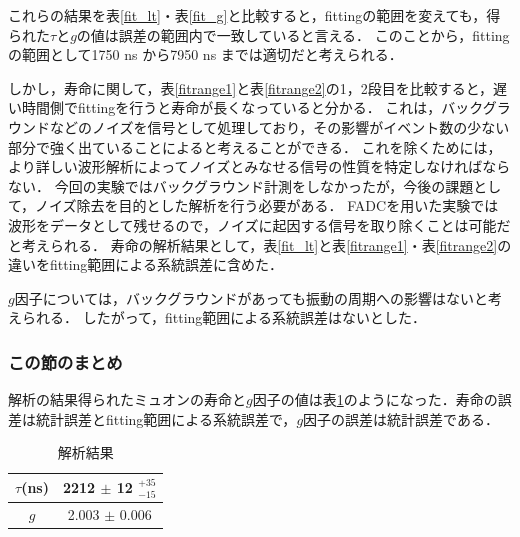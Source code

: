 これらの結果を表\ref{fit_lt}・表\ref{fit_g}と比較すると，fittingの範囲を変えても，得られた$\tau$と$g$の値は誤差の範囲内で一致していると言える．
このことから，fittingの範囲として1750 ns から7950 ns までは適切だと考えられる．

しかし，寿命に関して，表\ref{fitrange1}と表\ref{fitrange2}の1，2段目を比較すると，遅い時間側でfittingを行うと寿命が長くなっていると分かる．
これは，バックグラウンドなどのノイズを信号として処理しており，その影響がイベント数の少ない部分で強く出ていることによると考えることができる．
これを除くためには，より詳しい波形解析によってノイズとみなせる信号の性質を特定しなければならない．
今回の実験ではバックグラウンド計測をしなかったが，今後の課題として，ノイズ除去を目的とした解析を行う必要がある．
FADCを用いた実験では波形をデータとして残せるので，ノイズに起因する信号を取り除くことは可能だと考えられる．
寿命の解析結果として，表\ref{fit_lt}と表\ref{fitrange1}・表\ref{fitrange2}の違いをfitting範囲による系統誤差に含めた．

$g$因子については，バックグラウンドがあっても振動の周期への影響はないと考えられる．
したがって，fitting範囲による系統誤差はないとした．

\subsubsection{この節のまとめ}
解析の結果得られたミュオンの寿命と$g$因子の値は表\ref{matome_ike}のようになった．寿命の誤差は統計誤差とfitting範囲による系統誤差で，$g$因子の誤差は統計誤差である．

\begin{table}[H]
\caption{解析結果}
\label{matome_ike}
\begin{center}
\begin{tabular}{cc}\toprule
$\tau$(ns) 	& 2212 $\pm$ 12 $^{ + 35}_{ - 15}$  \\ \midrule
$g$		& 2.003 $\pm$ 0.006 \\ \bottomrule
\end{tabular}
\end{center}
\end{table}%


%
